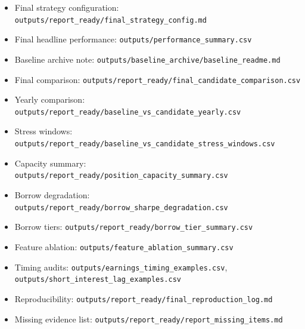 \documentclass[
]{article}
\providecommand{\tightlist}{%
  \setlength{\itemsep}{0pt}\setlength{\parskip}{0pt}}
\begin{document}
\begin{itemize}
\tightlist
\item
  Final strategy configuration:
  \texttt{outputs/report\_ready/final\_strategy\_config.md}
\item
  Final headline performance: \texttt{outputs/performance\_summary.csv}
\item
  Baseline archive note:
  \texttt{outputs/baseline\_archive/baseline\_readme.md}
\item
  Final comparison:
  \texttt{outputs/report\_ready/final\_candidate\_comparison.csv}
\item
  Yearly comparison:
  \texttt{outputs/report\_ready/baseline\_vs\_candidate\_yearly.csv}
\item
  Stress windows:
  \texttt{outputs/report\_ready/baseline\_vs\_candidate\_stress\_windows.csv}
\item
  Capacity summary:
  \texttt{outputs/report\_ready/position\_capacity\_summary.csv}
\item
  Borrow degradation:
  \texttt{outputs/report\_ready/borrow\_sharpe\_degradation.csv}
\item
  Borrow tiers: \texttt{outputs/report\_ready/borrow\_tier\_summary.csv}
\item
  Feature ablation: \texttt{outputs/feature\_ablation\_summary.csv}
\item
  Timing audits: \texttt{outputs/earnings\_timing\_examples.csv},
  \texttt{outputs/short\_interest\_lag\_examples.csv}
\item
  Reproducibility:
  \texttt{outputs/report\_ready/final\_reproduction\_log.md}
\item
  Missing evidence list:
  \texttt{outputs/report\_ready/report\_missing\_items.md}
\end{itemize}
\end{document}
